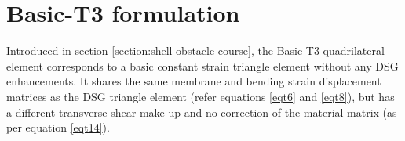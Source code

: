 
\chapter{Basic-T3 formulation}
\label{sec:Basic-T3 quadrilateral formulation}
\renewcommand{\Thema}{Basic-T3 quadrilateral formulation}

Introduced in section \ref{section:shell obstacle course}, the Basic-T3 quadrilateral element corresponds to a basic constant strain triangle element without any DSG enhancements. It shares the same membrane and bending strain displacement matrices as the DSG triangle element (refer equations \ref{eqt6} and \ref{eqt8}), but has a different transverse shear make-up and no correction of the material matrix (as per equation \ref{eqt14}). 

